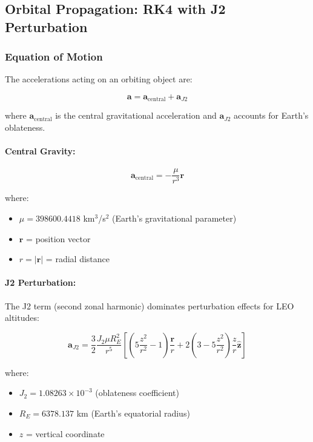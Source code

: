 \documentclass[11pt,a4paper]{article}
\begin{document}
\subsection{Orbital Propagation: RK4 with J2 Perturbation}

\subsubsection{Equation of Motion}

The accelerations acting on an orbiting object are:

\begin{equation}
\mathbf{a} = \mathbf{a}_{\text{central}} + \mathbf{a}_{J2}
\end{equation}

where $\mathbf{a}_{\text{central}}$ is the central gravitational acceleration and $\mathbf{a}_{J2}$ accounts for Earth's oblateness.

\paragraph{Central Gravity:}
\begin{equation}
\mathbf{a}_{\text{central}} = -\frac{\mu}{r^3} \mathbf{r}
\end{equation}

where:
\begin{itemize}
    \item $\mu = 398600.4418$ km$^3$/s$^2$ (Earth's gravitational parameter)
    \item $\mathbf{r}$ = position vector
    \item $r = |\mathbf{r}|$ = radial distance
\end{itemize}

\paragraph{J2 Perturbation:}

The J2 term (second zonal harmonic) dominates perturbation effects for LEO altitudes:

\begin{equation}
\mathbf{a}_{J2} = \frac{3}{2} \frac{J_2 \mu R_E^2}{r^5} \left[ (5\frac{z^2}{r^2} - 1) \frac{\mathbf{r}}{r} + 2(3 - 5\frac{z^2}{r^2}) \frac{z}{r} \mathbf{\hat{z}} \right]
\end{equation}

where:
\begin{itemize}
    \item $J_2 = 1.08263 \times 10^{-3}$ (oblateness coefficient)
    \item $R_E = 6378.137$ km (Earth's equatorial radius)
    \item $z$ = vertical coordinate
\end{itemize}
\end{document}
